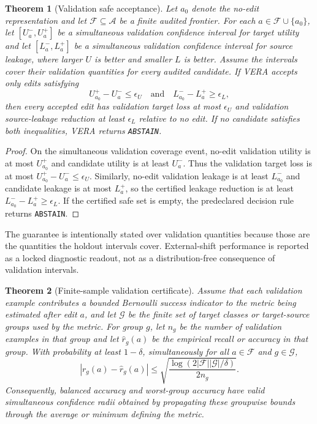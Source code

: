 \documentclass[10pt]{article}
\newtheorem{theorem}{Theorem}
\begin{document}
\begin{theorem}[Validation safe acceptance]
Let $a_0$ denote the no-edit representation and let
$\mathcal{F}\subseteq\mathcal{A}$ be a finite audited frontier. For each
$a\in \mathcal{F}\cup\{a_0\}$, let $[U^-_a,U^+_a]$ be a simultaneous
validation confidence interval for target utility and let $[L^-_a,L^+_a]$ be a
simultaneous validation confidence interval for source leakage, where larger
$U$ is better and smaller $L$ is better. Assume the intervals cover their
validation quantities for every audited candidate. If VERA accepts only edits
satisfying
\[
U^+_{a_0}-U^-_a \le \epsilon_U
\quad\textrm{and}\quad
L^-_{a_0}-L^+_a \ge \epsilon_L ,
\]
then every accepted edit has validation target loss at most $\epsilon_U$ and
validation source-leakage reduction at least $\epsilon_L$ relative to no edit.
If no candidate satisfies both inequalities, VERA returns \texttt{ABSTAIN}.
\end{theorem}

\begin{proof}
On the simultaneous validation coverage event, no-edit validation utility is at
most $U^+_{a_0}$ and candidate utility is at least $U^-_a$. Thus the validation
target loss is at most $U^+_{a_0}-U^-_a\le\epsilon_U$. Similarly, no-edit
validation leakage is at least $L^-_{a_0}$ and candidate leakage is at most
$L^+_a$, so the certified leakage reduction is at least
$L^-_{a_0}-L^+_a\ge\epsilon_L$. If the certified safe set is empty, the
predeclared decision rule returns \texttt{ABSTAIN}.
\end{proof}

The guarantee is intentionally stated over validation quantities because those
are the quantities the holdout intervals cover. External-shift performance is
reported as a locked diagnostic readout, not as a distribution-free consequence
of validation intervals.

\begin{theorem}[Finite-sample validation certificate]
Assume that each validation example contributes a bounded Bernoulli success
indicator to the metric being estimated after edit $a$, and let
$\mathcal{G}$ be the finite set of target classes or target-source groups used
by the metric. For group $g$, let $n_g$ be the number of validation examples in
that group and let $\widehat r_g(a)$ be the empirical recall or accuracy in
that group. With probability at least $1-\delta$, simultaneously for all
$a \in \mathcal{F}$ and $g \in \mathcal{G}$,
\[
|r_g(a)-\widehat r_g(a)| \le
\sqrt{\frac{\log(2|\mathcal{F}||\mathcal{G}|/\delta)}{2n_g}} .
\]
Consequently, balanced accuracy and worst-group accuracy have valid
simultaneous confidence radii obtained by propagating these groupwise bounds
through the average or minimum defining the metric.
\end{theorem}
\end{document}
